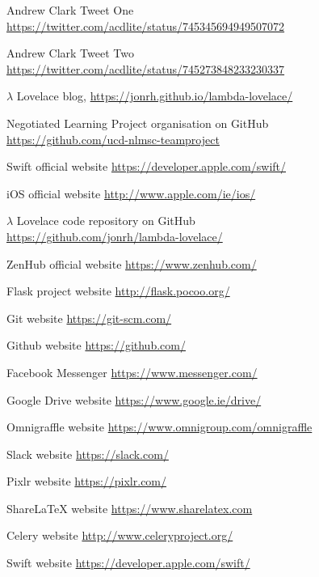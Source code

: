 \documentclass{article}
\begin{document}
\begin{thebibliography}{9} 

    Andrew Clark Tweet One \\
    \url{https://twitter.com/acdlite/status/745345694949507072}
    
    Andrew Clark Tweet Two \\
    \url{https://twitter.com/acdlite/status/745273848233230337}
    
	$\lambda$ Lovelace blog, \url{https://jonrh.github.io/lambda-lovelace/}
	
	Negotiated Learning Project organisation on GitHub \\
	\url{https://github.com/ucd-nlmsc-teamproject}

	Swift official website \url{https://developer.apple.com/swift/}
	
	iOS official website \url{http://www.apple.com/ie/ios/}

	$\lambda$ Lovelace code repository on GitHub \\
	\url{https://github.com/jonrh/lambda-lovelace/}
	
	ZenHub official website \url{https://www.zenhub.com/}

    Flask project website \url{http://flask.pocoo.org/}
    
    Git website \url{https://git-scm.com/}

    Github website \url{https://github.com/}

    Facebook Messenger \url{https://www.messenger.com/}

    Google Drive website \url{https://www.google.ie/drive/}

    Omnigraffle website \url{https://www.omnigroup.com/omnigraffle}

    Slack website \url{https://slack.com/}
    
    Pixlr website \url{https://pixlr.com/}
     
    ShareLaTeX website \url{https://www.sharelatex.com}
    
    Celery website \url{http://www.celeryproject.org/}

    Swift website \url{https://developer.apple.com/swift/}
    

\end{thebibliography}
\end{document}
